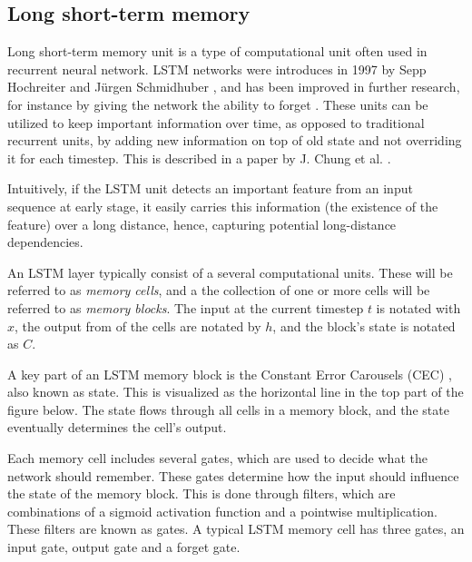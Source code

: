 \subsection{Long short-term memory}
\label{theory-LSTM}
Long short-term memory unit is a type of computational unit often used in recurrent neural network. LSTM networks were introduces in 1997 by Sepp Hochreiter and Jürgen Schmidhuber \cite{hochreiter_long_1997}, and has been improved in further research, for instance by giving the network the ability to forget \cite{gers_learning_1999}. These units can be utilized to keep important information over time, as opposed to traditional recurrent units, by adding new information on top of old state and not overriding it for each timestep. This is described in a paper by J. Chung et al. \cite{chung_empirical_2014}.

\begin{displayquote}
    Intuitively, if the LSTM unit detects an important feature from an input sequence at early stage, it
    easily carries this information (the existence of the feature) over a long distance, hence, capturing
    potential long-distance dependencies.
\end{displayquote}

An LSTM layer typically consist of a several computational units. These will be referred to as \textit{memory cells}, and a the collection of one or more cells will be referred to as \textit{memory blocks}. The input at the current timestep $t$ is notated with $x$, the output from of the cells are notated by $h$, and the block's state is notated as $C$.

A key part of an LSTM memory block is the Constant Error Carousels (CEC) \cite{gers_learning_1999}, also known as state. This is visualized as the horizontal line in the top part of the figure below. The state flows through all cells in a memory block, and the state eventually determines the cell's output.

Each memory cell includes several gates, which are used to decide what the network should remember. These gates determine how the input should influence the state of the memory block. This is done through filters, which are combinations of a sigmoid activation function and a pointwise multiplication. These filters are known as gates. A typical LSTM memory cell has three gates, an input gate, output gate and a forget gate.


